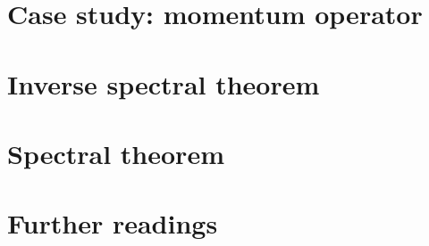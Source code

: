 \documentclass[a4paper,11pt]{report}
\theoremstyle{plain}
\theoremstyle{definition}
\theoremstyle{remark}
\theoremstyle{underline}
\begin{document}
  \chapter{Case study: momentum operator}
  

  \chapter{Inverse spectral theorem}
  

  \chapter{Spectral theorem}
  

  \chapter*{Further readings}
  
\end{document}
